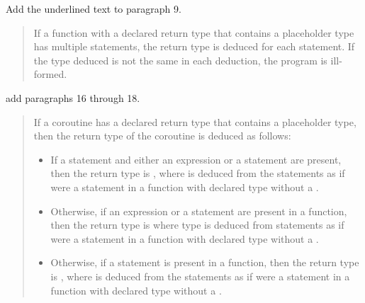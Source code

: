 Add the underlined text to paragraph 9.

\begin{quote}
\setcounter{Paras}{8}
\pnum
If a function with a declared return type that contains a placeholder type has
multiple  statements, the return type is deduced for each
 statement. If the type deduced is not the same in each
deduction, the program is ill-formed.
\end{quote}

add paragraphs 16 through 18.

\begin{quote}
\setcounter{Paras}{15}

%

\pnum
If a coroutine has a declared return type that contains a placeholder type, then the return type of the coroutine is deduced as follows:

\begin{itemize}
\item If a  statement and either an  expression or a  statement are present, then
the return type is , where  is deduced from the  statements as if  were a  statement in a function with declared type  without a .


\item Otherwise, if an  expression or a  statement are present in a function, then
the return type is  where type  is deduced from 
 statements as if  were a  statement in a function with declared type  without a .


\item Otherwise, if a  statement is present in a function, then the return type is \linebreak
{},
where  is deduced from the  statements  as if  were a  statement in a function with declared type  without a .


\end{itemize}
\end{quote}
